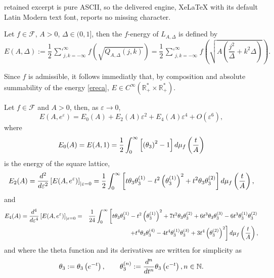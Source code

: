 \documentclass[10pt,a4paper]{amsart}
\def\xsum{\mathop{\sum\nolimits'}}
\newcommand{\N}{\mathbb N}
\newcommand{\R}{\mathbb R}
\begin{document}
retained excerpt is pure ASCII, so the delivered engine, XeLaTeX with its default Latin Modern text font, reports no missing character.
\begin{defi}
Let $f\in \mathcal{F}$, $A>0$, $\Delta\in (0,1]$, then the $f$-energy of $L_{A,\Delta}$ is defined by
\begin{equation} \label{ereca}
E(A,\Delta):=\frac{1}{2} \xsum_{j,k=-\infty}^{\infty}
f\left(\sqrt{Q_{A,\Delta}(j,k)} \right)=\frac{1}{2} \xsum_{j,k=-\infty}^{\infty}
f \left( \sqrt{A \left( \frac{j^2}{\Delta} + k^2\Delta \right)} \right).
\end{equation}
\end{defi}

\begin{remark}\label{regularity}
Since $f$ is admissible, it follows immediatly that, by composition and absolute summability of the energy \eqref{ereca}, $E\in C^{\infty}(\R_+^*\times \R_+^*)$.
\end{remark}

\begin{thm}
Let $f\in \mathcal{F}$ and $A>0$, then, as $\varepsilon\to 0$,
\begin{equation} \label{ecreps}
E(A,e^\varepsilon) = E_0(A) + E_2(A) \varepsilon^2 + E_4(A) \varepsilon^4
+ O(\varepsilon^6) ,
\end{equation}
where 
\begin{equation} 
E_0(A) = E(A,1)= \frac{1}{2} \int_0^\infty 
\left[ \left( \theta_3 \right)^2 - 1 \right]{\rm d}\mu_f\left(\frac{t}{A} \right)
\end{equation}
is the energy of the square lattice,
\begin{equation} \label{E2A} 
E_2(A) =\frac{d^2}{d\varepsilon^2}\left[ E(A,e^\varepsilon)\right]_{|\varepsilon=0}
= \frac{1}{2} \int_0^\infty \left[ t \theta_3 \theta_3^{(1)}
- t^2 \left( \theta_3^{(1)} \right)^2 + t^2 \theta_3 \theta_3^{(2)} \right]
{\rm d}\mu_f\left(\frac{t}{A} \right) ,
\end{equation}
and 
\begin{eqnarray} 
E_4(A)  = \frac{d^4}{d\varepsilon^4}\left[ E(A,e^\varepsilon)\right]_{|\varepsilon=0}
& = & \frac{1}{24} \int_0^\infty 
\left[ t \theta_3 \theta_3^{(1)} - t^2 \left( \theta_3^{(1)} \right)^2
+ 7 t^2 \theta_3 \theta_3^{(2)} + 6 t^3 \theta_3 \theta_3^{(3)}
-6 t^3 \theta_3^{(1)} \theta_3^{(2)}\right. \nonumber \\ & & \left.
 + t^4 \theta_3 \theta_3^{(4)}
- 4 t^4 \theta_3^{(1)} \theta_3^{(3)} + 3 t^4 \left( \theta_3^{(2)} \right)^2
\right]{\rm d}\mu_f\left(\frac{t}{A} \right),
\end{eqnarray}
and where the theta function and its derivatives are written for simplicity as
\begin{equation}
\theta_3 := \theta_3\left({\rm e}^{-t}\right) , \qquad
\theta_3^{(n)} := \frac{{\rm d}^n}{{\rm d}t^n}
\theta_3\left({\rm e}^{-t}\right), n\in \N.
\end{equation} 
\end{thm}
\end{document}
